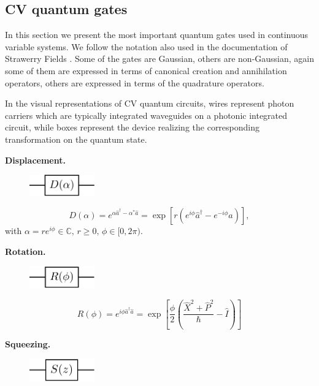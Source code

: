 \documentclass[12pt, a4paper,  nobibnotes]{article}
\newcommand{\op}[1]{\hat{#1}}
\begin{document}
\subsection{CV quantum gates}
In this section we present the most important quantum gates used in continuous variable 
systems. We follow the notation also used in the documentation of Strawerry Fields \cite{Killoran2019strawberryfields,StrawberryFieldsDocumentation}.
Some of the gates are Gaussian, others are non-Gaussian, again some of them 
are expressed in terms of canonical creation and annihilation operators, others are expressed 
in terms of the quadrature operators.

In the visual representations of CV quantum circuits,
wires represent photon carriers which are typically integrated waveguides on a 
photonic integrated circuit, while boxes represent the device realizing the corresponding
transformation on the quantum state.

\par \textbf{Displacement.}
\begin{figure}[H]
    \centering
    \includegraphics[width=0.25\textwidth]{figures/displacement.pdf}
\end{figure}

\begin{equation}
     D(\alpha) = e^{\alpha \op a^\dagger - \alpha^* \op a} 
      = \exp\left[r\left(e^{i\phi}\op a^\dagger - e^{-i\phi}\op a \right)\right],
\end{equation}
with $\alpha = re^{i\phi} \in\mathbb{C},\, r\geq 0,\, \phi\in [0,2\pi)$.
\par \textbf{Rotation.}
\begin{figure}[H]
    \centering
    \includegraphics[width=0.25\textwidth]{figures/rotation.pdf}
\end{figure}

\begin{equation}
     R(\phi) = e^{i\phi\op a^\dagger \op a} = \exp\left[\frac{\phi}{2}\left(\frac{\op X^2 + \op P^2}{\hbar}-\op I\right)\right]
\end{equation}


\par \textbf{Squeezing.}
\begin{figure}[H]
    \centering
    \includegraphics[width=0.25\textwidth]{figures/squeezing.pdf}
\end{figure}
\end{document}
